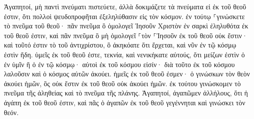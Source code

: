 \documentclass{openreader}
\begin{document}
Ἀγαπητοί, μὴ παντὶ πνεύματι πιστεύετε, ἀλλὰ δοκιμάζετε τὰ πνεύματα εἰ ἐκ τοῦ θεοῦ ἐστιν, ὅτι πολλοὶ ψευδοπροφῆται ἐξεληλύθασιν εἰς τὸν κόσμον. 
ἐν τούτῳ ⸀γινώσκετε τὸ πνεῦμα τοῦ θεοῦ· πᾶν πνεῦμα ὃ ὁμολογεῖ Ἰησοῦν Χριστὸν ἐν σαρκὶ ἐληλυθότα ἐκ τοῦ θεοῦ ἐστιν, 
καὶ πᾶν πνεῦμα ὃ μὴ ὁμολογεῖ ⸀τὸν ⸀Ἰησοῦν ἐκ τοῦ θεοῦ οὐκ ἔστιν· καὶ τοῦτό ἐστιν τὸ τοῦ ἀντιχρίστου, ὃ ἀκηκόατε ὅτι ἔρχεται, καὶ νῦν ἐν τῷ κόσμῳ ἐστὶν ἤδη. 
ὑμεῖς ἐκ τοῦ θεοῦ ἐστε, τεκνία, καὶ νενικήκατε αὐτούς, ὅτι μείζων ἐστὶν ὁ ἐν ὑμῖν ἢ ὁ ἐν τῷ κόσμῳ· 
αὐτοὶ ἐκ τοῦ κόσμου εἰσίν· διὰ τοῦτο ἐκ τοῦ κόσμου λαλοῦσιν καὶ ὁ κόσμος αὐτῶν ἀκούει. 
ἡμεῖς ἐκ τοῦ θεοῦ ἐσμεν· ὁ γινώσκων τὸν θεὸν ἀκούει ἡμῶν, ὃς οὐκ ἔστιν ἐκ τοῦ θεοῦ οὐκ ἀκούει ἡμῶν. ἐκ τούτου γινώσκομεν τὸ πνεῦμα τῆς ἀληθείας καὶ τὸ πνεῦμα τῆς πλάνης. 
Ἀγαπητοί, ἀγαπῶμεν ἀλλήλους, ὅτι ἡ ἀγάπη ἐκ τοῦ θεοῦ ἐστιν, καὶ πᾶς ὁ ἀγαπῶν ἐκ τοῦ θεοῦ γεγέννηται καὶ γινώσκει τὸν θεόν. 
\end{document}
